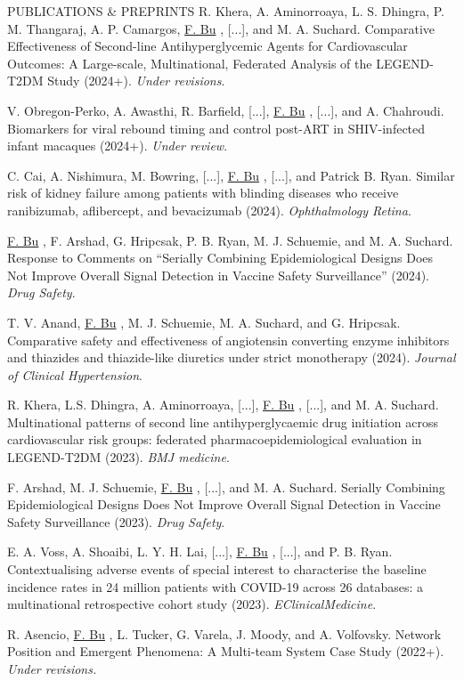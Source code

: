 \documentclass{resume} %
\newcommand{\myName}[1]{
	\underline{#1}
}
\begin{document}
\begin{rSection}{PUBLICATIONS \& PREPRINTS}
R. Khera, A. Aminorroaya, L. S. Dhingra, P. M.  Thangaraj, A. P. Camargos, \myName{F. Bu}, [...], and M. A. Suchard. Comparative Effectiveness of Second-line Antihyperglycemic Agents for Cardiovascular Outcomes: A Large-scale, Multinational, Federated Analysis of the LEGEND-T2DM Study (2024+). \emph{Under revisions}. 

\smallskip 

V. Obregon-Perko, A. Awasthi, R. Barfield, [...], \myName{F. Bu}, [...], and A. Chahroudi. Biomarkers for viral rebound timing and control post-ART in SHIV-infected infant macaques (2024+). \emph{Under review}.

\smallskip 

C. Cai, A. Nishimura, M. Bowring, [...], \myName{F. Bu}, [...], and Patrick B. Ryan. Similar risk of kidney failure among patients with blinding diseases who receive ranibizumab, aflibercept, and bevacizumab (2024). \emph{Ophthalmology Retina}.

\smallskip 

\myName{F. Bu}, F. Arshad, G. Hripcsak, P. B. Ryan, M. J. Schuemie, and M. A. Suchard. Response to Comments on ``Serially Combining Epidemiological Designs Does Not Improve Overall Signal Detection in Vaccine Safety Surveillance'' (2024). \emph{Drug Safety}. 

\smallskip 

T. V. Anand,\myName{F. Bu}, M. J. Schuemie, M. A. Suchard, and G. Hripcsak. Comparative safety and effectiveness of angiotensin converting enzyme inhibitors and thiazides and thiazide-like diuretics under strict monotherapy (2024).  \emph{Journal of Clinical Hypertension}.

\smallskip 

R. Khera, L.S. Dhingra, A. Aminorroaya, [...], \myName{F. Bu}, [...], and  M. A. Suchard.  Multinational patterns of second line antihyperglycaemic drug initiation across cardiovascular risk groups: federated pharmacoepidemiological evaluation in LEGEND-T2DM (2023). \emph{BMJ medicine}. 

\smallskip

F. Arshad, M. J. Schuemie, \myName{F. Bu}, [...], and M. A. Suchard. Serially Combining Epidemiological Designs Does Not Improve Overall Signal Detection in Vaccine Safety Surveillance (2023). \emph{Drug Safety}. 

\smallskip

E. A. Voss, A. Shoaibi, L. Y. H. Lai,  [...], \myName{F. Bu}, [...], and P. B. Ryan. Contextualising adverse events of special interest to characterise the baseline incidence rates in 24 million patients with COVID-19 across 26 databases: a multinational retrospective cohort study (2023). \emph{EClinicalMedicine}. 


\smallskip

R. Asencio, \myName{F. Bu}, L. Tucker, G. Varela, J. Moody, and A. Volfovsky. 
Network Position and Emergent Phenomena: A Multi-team System Case Study (2022+). \emph{Under revisions.}




\end{rSection}
\end{document}

